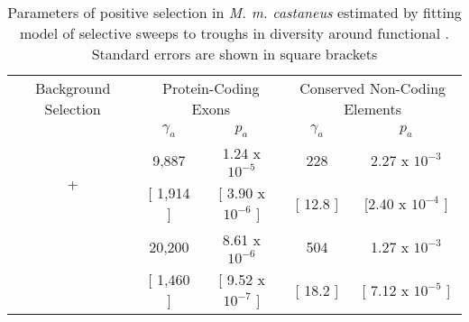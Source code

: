 

\begin{table}[h]
\caption{Parameters of positive selection in \textit{M. m. castaneus} estimated by fitting model of selective sweeps to troughs in diversity around functional . Standard errors are shown in square brackets}
\centering
	\label{EstimatesCastaneus}
        \begin{tabular}{ccccc}

        \hline
             Background Selection & \multicolumn{2}{c}{Protein-Coding Exons} & \multicolumn{2}{c}{Conserved Non-Coding Elements}  \\
   &  $\gamma_a$ & $p_a$ &$\gamma_a$ & $p_a$  \\ [0.5ex] \hline

 \multirow{2}{*}{+} &  9,887 & 1.24 x $10^{-5}$ & 228 & 2.27 x $10^{-3}$ \\
   &  [ 1,914 ] & [ 3.90 x $10^{-6}$ ]& [ 12.8 ] & [2.40 x $10^{-4}$ ]\\ \hdashline
   
 \multirow{2}{*}{-}  &  20,200 & 8.61 x $10^{-6}$ & 504 & 1.27 x $10^{-3}$ \\
  &   [ 1,460 ] & [ 9.52 x $10^{-7}$ ]& [ 18.2 ] & [ 7.12 x $10^{-5}$ ]\\ \hline

        \end{tabular}
    \label{tab:Table2}
    
\end{table}

\linespread{1}
